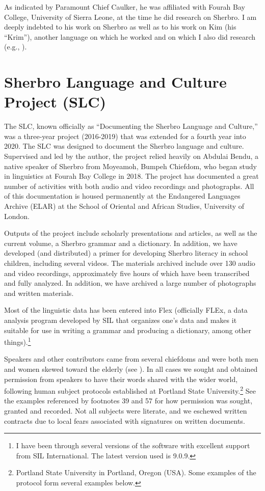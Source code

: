 As indicated by Paramount Chief Caulker, he was affiliated with Fourah Bay College, University of Sierra Leone, at the time he did research on Sherbro. I am deeply indebted to his work on Sherbro as well as to his work on Kim (his “Krim”), another language on which he worked and on which I also did research (e.g., \citealt{Childs2020}).

\section{Sherbro Language and Culture Project (SLC)}
\label{sec:1.2}\hypertarget{Toc115517744}{}
The SLC, known officially as “Documenting the Sherbro Language and Culture,” was a three-year project (2016-2019) that was extended for a fourth year into 2020. The SLC was designed to document the Sherbro language and culture. Supervised and led by the author, the project relied heavily on Abdulai Bendu, a native speaker of Sherbro from Moyeamoh, Bumpeh Chiefdom, who began study in linguistics at Fourah Bay College in 2018. The project has documented a great number of activities with both audio and video recordings and photographs. All of this documentation is housed permanently at the Endangered Languages Archive (ELAR) at the School of Oriental and African Studies, University of London.

Outputs of the project include scholarly presentations and articles, as well as the current volume, a Sherbro grammar and a dictionary. In addition, we have developed (and distributed) a primer for developing Sherbro literacy in school children, including several videos. The materials archived include over 130 audio and video recordings, approximately five hours of which have been transcribed and fully analyzed. In addition, we have archived a large number of photographs and written materials.

Most of the linguistic data has been entered into Flex (officially FLEx, a data analysis program developed by SIL that organizes one's data and makes it suitable for use in writing a grammar and producing a dictionary, among other things).\footnote{I have been through several versions of the software with excellent support from SIL International. The latest version used is 9.0.9.}

Speakers and other contributors came from several chiefdoms and were both men and women skewed toward the elderly (see ). In all cases we sought and obtained permission from speakers to have their words shared with the wider world, following human subject protocols established at Portland State University.\footnote{Portland State University in Portland, Oregon (USA). Some examples of the protocol form several examples below.} See the examples referenced by footnotes 39 and 57 for how permission was sought, granted and recorded. Not all subjects were literate, and we eschewed written contracts due to local fears associated with signatures on written documents.

